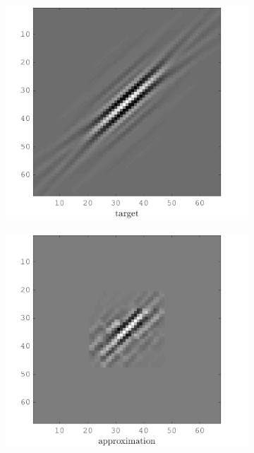 \begin{figure}[!h]\centering
    \begin{subfigure}[b]{0.49\textwidth}\centering
    \includegraphics[width=\textwidth]{figures/xp/xp_128x128_sc2_angl1_K3_S3_node3_target.png}
    \end{subfigure}
\begin{subfigure}[b]{0.49\textwidth}\centering
\includegraphics[width=\textwidth]{figures/xp/xp_128x128_sc2_angl1_K3_S3_node3_approx.png}

\end{subfigure}
\end{figure}
